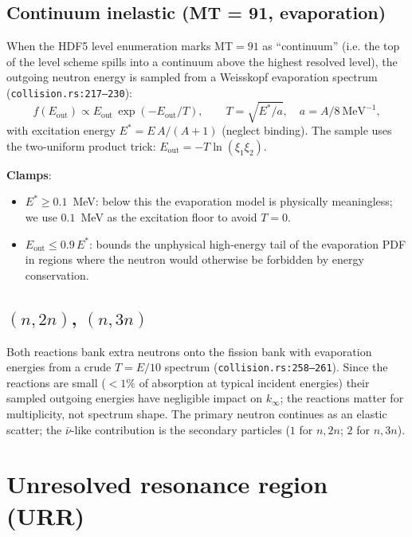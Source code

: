 \documentclass[11pt,a4paper]{article}
\begin{document}
\subsection{Continuum inelastic (MT = 91, evaporation)}
\label{sec:mt91}

When the HDF5 level enumeration marks MT$=91$ as ``continuum''
(i.e. the top of the level scheme spills into a continuum above
the highest resolved level), the outgoing neutron energy is
sampled from a Weisskopf evaporation spectrum
(\texttt{collision.rs:217--230}):
\begin{equation}
f(E_\text{out}) \propto E_\text{out}\, \exp(-E_\text{out}/T),
\qquad
T = \sqrt{E^*/a},\quad
a = A/8 \ \mathrm{MeV}^{-1},
\end{equation}
with excitation energy $E^* = E\, A/(A+1)$ (neglect binding).
The sample uses the two-uniform product trick:
$E_\text{out} = -T \ln(\xi_1 \xi_2)$.

\textbf{Clamps}:
\begin{itemize}
  \item $E^* \geq 0.1$~MeV: below this the evaporation model is
  physically meaningless; we use $0.1$~MeV as the excitation
  floor to avoid $T = 0$.
  \item $E_\text{out} \leq 0.9\, E^*$: bounds the unphysical
  high-energy tail of the evaporation PDF in regions where the
  neutron would otherwise be forbidden by energy conservation.
\end{itemize}

\subsection{$(n,2n)$, $(n,3n)$}

Both reactions bank extra neutrons onto the fission bank with
evaporation energies from a crude $T = E/10$ spectrum
(\texttt{collision.rs:258--261}). Since the reactions are small
($< 1\%$ of absorption at typical incident energies) their
sampled outgoing energies have negligible impact on $k_\infty$;
the reactions matter for multiplicity, not spectrum shape.
The primary neutron continues as an elastic scatter; the
$\bar{\nu}$-like contribution is the secondary particles
($1$ for $n,2n$; $2$ for $n,3n$).

\section{Unresolved resonance region (URR)}
\label{sec:urr}
\end{document}
